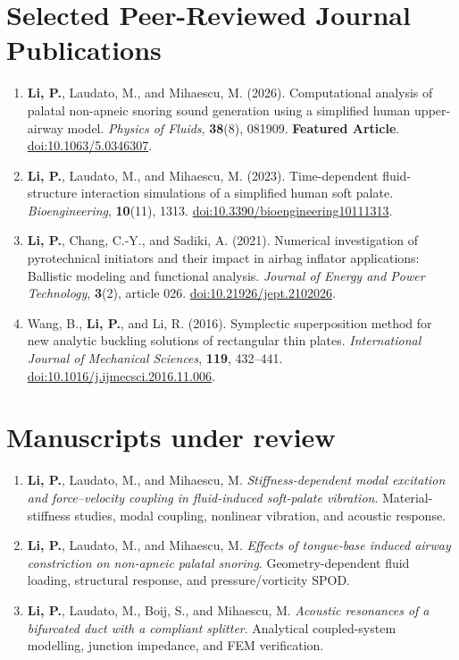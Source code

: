 \documentclass[a4paper,10pt]{article}
\begin{document}
\section{Selected Peer-Reviewed Journal Publications}
\begin{enumerate}
\item \textbf{Li, P.}, Laudato, M., and Mihaescu, M. (2026).
Computational analysis of palatal non-apneic snoring sound generation using a simplified
human upper-airway model. \textit{Physics of Fluids}, \textbf{38}(8), 081909.
\textbf{Featured Article}.
\href{https://doi.org/10.1063/5.0346307}{doi:10.1063/5.0346307}.
\item \textbf{Li, P.}, Laudato, M., and Mihaescu, M. (2023).
Time-dependent fluid-structure interaction simulations of a simplified human soft palate.
\textit{Bioengineering}, \textbf{10}(11), 1313.
\href{https://doi.org/10.3390/bioengineering10111313}{doi:10.3390/bioengineering10111313}.
\item \textbf{Li, P.}, Chang, C.-Y., and Sadiki, A. (2021).
Numerical investigation of pyrotechnical initiators and their impact in airbag inflator
applications: Ballistic modeling and functional analysis.
\textit{Journal of Energy and Power Technology}, \textbf{3}(2), article 026.
\href{https://doi.org/10.21926/jept.2102026}{doi:10.21926/jept.2102026}.
\item Wang, B., \textbf{Li, P.}, and Li, R. (2016).
Symplectic superposition method for new analytic buckling solutions of rectangular thin plates.
\textit{International Journal of Mechanical Sciences}, \textbf{119}, 432--441.
\href{https://doi.org/10.1016/j.ijmecsci.2016.11.006}{doi:10.1016/j.ijmecsci.2016.11.006}.
\end{enumerate}

\section{Manuscripts under review}
\begin{enumerate}
\item \textbf{Li, P.}, Laudato, M., and Mihaescu, M.
\textit{Stiffness-dependent modal excitation and force--velocity coupling in fluid-induced soft-palate vibration}.
Material-stiffness studies, modal coupling, nonlinear vibration, and acoustic response.
\item \textbf{Li, P.}, Laudato, M., and Mihaescu, M.
\textit{Effects of tongue-base induced airway constriction on non-apneic palatal snoring}.
Geometry-dependent fluid loading, structural response, and pressure/vorticity SPOD.
\item \textbf{Li, P.}, Laudato, M., Boij, S., and Mihaescu, M.
\textit{Acoustic resonances of a bifurcated duct with a compliant splitter}.
Analytical coupled-system modelling, junction impedance, and FEM verification.
\end{enumerate}
\end{document}
